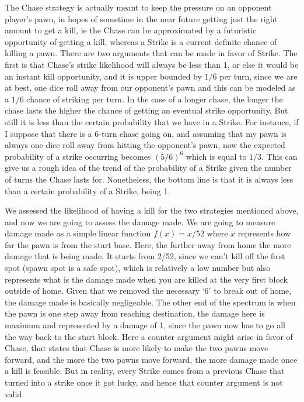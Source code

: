 \documentclass{article} %
\begin{document}
The Chase strategy is actually meant to keep the pressure on an opponent player’s pawn, in hopes of sometime in the near future getting just the right amount to get a kill, ie the Chase can be approximated by a futuristic opportunity of getting a kill, whereas a Strike is a current definite chance of killing a pawn. There are two arguments that can be made in favor of Strike. The first is that Chase’s strike likelihood will always be less than 1, or else it would be an instant kill opportunity, and it is upper bounded by $1/6$ per turn, since we are at best, one dice roll away from our opponent’s pawn and this can be modeled as a $1/6$ chance of striking per turn. In the case of a longer chase, the longer the chase lasts the higher the chance of getting an eventual strike opportunity. But still it is less than the certain probability that we have in a Strike. For instance, if I suppose that there is a 6-turn chase going on, and assuming that my pawn is always one dice roll away from hitting the opponent's pawn, now the expected probability of a strike occurring becomes $(5/6)^6$ which is equal to $1/3$. This can give us a rough idea of the trend of the probability of a Strike given the number of turns the Chase lasts for. Nonetheless, the bottom line is that it is always less than a certain probability of a Strike, being 1.

We assessed the likelihood of having a kill for the two strategies mentioned above, and now we are going to assess the damage made. We are going to measure damage made as a simple linear function $f(x) = x/52$ where $x$ represents how far the pawn is from the start base. Here, the further away from home the more damage that is being made. It starts from 2/52, since we can’t kill off the first spot (spawn spot is a safe spot), which is relatively a low number but also represents what is the damage made when you are killed at the very first block outside of home. Given that we removed the necessary ‘6’ to break out of home, the damage made is basically negligeable. The other end of the spectrum is when the pawn is one step away from reaching destination, the damage here is maximum and represented by a damage of 1, since the pawn now has to go all the way back to the start block. Here a counter argument might arise in favor of Chase, that states that Chase is more likely to make the two pawns move forward, and the more the two pawns move forward, the more damage made once a kill is feasible. But in reality, every Strike comes from a previous Chase that turned into a strike once it got lucky, and hence that counter argument is not valid.
\end{document}

